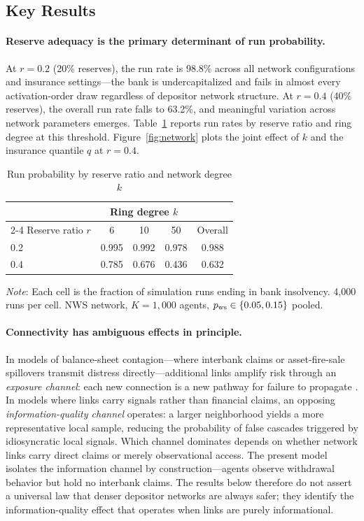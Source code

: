 \subsection{Key Results}

\paragraph{Reserve adequacy is the primary determinant of run
probability.}
At $r = 0.2$ (20\% reserves), the run rate is 98.8\% across all
network configurations and insurance settings---the bank is
undercapitalized and fails in almost every activation-order draw
regardless of depositor network structure. At $r = 0.4$ (40\%
reserves), the overall run rate falls to 63.2\%, and meaningful
variation across network parameters emerges. Table~\ref{tab:reserve_k}
reports run rates by reserve ratio and ring degree at this threshold.
Figure~\ref{fig:network} plots the joint effect of $k$ and the
insurance quantile $q$ at $r = 0.4$.

\begin{table}[ht]
\centering
\caption{Run probability by reserve ratio and network degree $k$}
\label{tab:reserve_k}
\begin{tabular}{lcccc}
\hline\hline
 & \multicolumn{3}{c}{Ring degree $k$} & \\
\cline{2-4}
Reserve ratio $r$ & 6 & 10 & 50 & Overall \\
\hline
0.2 & 0.995 & 0.992 & 0.978 & 0.988 \\
0.4 & 0.785 & 0.676 & 0.436 & 0.632 \\
\hline\hline
\end{tabular}
\smallskip

\small\textit{Note}: Each cell is the fraction of simulation runs ending
in bank insolvency. 4{,}000 runs per cell. NWS network,
$K = 1{,}000$ agents, $p_{\rm ws} \in \{0.05, 0.15\}$ pooled.
\end{table}

\paragraph{Connectivity has ambiguous effects in principle.}
In models of balance-sheet contagion---where interbank claims or
asset-fire-sale spillovers transmit distress directly---additional
links amplify risk through an \emph{exposure channel}: each new
connection is a new pathway for failure to propagate
\citep{allen2000financial, acemoglu2015systemic}. In models where
links carry signals rather than financial claims, an opposing
\emph{information-quality channel} operates: a larger neighborhood
yields a more representative local sample, reducing the probability
of false cascades triggered by idiosyncratic local signals. Which
channel dominates depends on whether network links carry direct
claims or merely observational access. The present model isolates
the information channel by construction---agents observe withdrawal
behavior but hold no interbank claims. The results below therefore
do not assert a universal law that denser depositor networks are
always safer; they identify the information-quality effect that
operates when links are purely informational.

